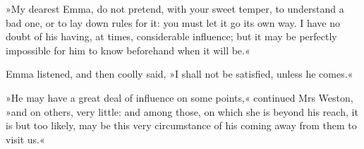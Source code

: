 »My dearest Emma, do not pretend, with your sweet temper, to understand a bad one, or to lay down rules for it: you must let it go its own way. I have no doubt of his having, at times, considerable influence; but it may be perfectly impossible for him to know beforehand when it will be.«

Emma listened, and then coolly said, »I shall not be satisfied, unless he comes.«

»He may have a great deal of influence on some points,« continued Mrs Weston, »and on others, very little: and among those, on which she is beyond his reach, it is but too likely, may be this very circumstance of his coming away from them to visit us.«